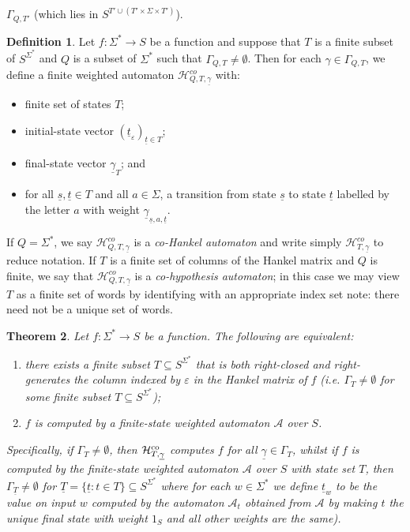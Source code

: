 \documentclass[10pt,a4paper]{amsart}
\newtheorem{thm}{Theorem}[section]
\theoremstyle{definition}
\newtheorem{defi}[thm]{Definition}
\numberwithin{equation}{section}
\numberwithin{theorem}{section}
\begin{document}
$\Gamma_{Q, T'}$ (which lies in $S^{T' \cup (T'\times \Sigma \times T')}$).
\begin{defi}
\label{definition:cohankel}
Let $f: \Sigma^* \rightarrow S$ be a function and suppose that $T$ is a finite subset of $S^{\Sigma^*}$ and $Q$ is a subset of $\Sigma^*$ such that $\Gamma_{Q, T} \neq \emptyset$. Then for each $\gamma \in \Gamma_{Q, T}$, we define a finite weighted automaton $\mathcal{H}^{co}_{Q, T, \underline{\gamma}}$ with:
\begin{itemize}
\item finite set of states $T$;
\item initial-state vector $(\underline{t}_\varepsilon)_{\underline{t} \in T}$;
\item final-state vector $\underline{\gamma}_{T}$; and
\item for all $\underline{s}, \underline{t} \in T$ and all $a \in \Sigma$, a transition from state $\underline{s}$ to state $\underline{t}$ labelled by the letter $a$ with weight $\underline{\gamma}_{\underline{s},a,\underline{t}}$.
\end{itemize}\noindent %
If $Q = \Sigma^*$,  we say $\mathcal{H}^{co}_{Q, T, \underline{\gamma}}$ is a \emph{co-Hankel automaton} and write simply $\mathcal{H}^{co}_{T, \underline{\gamma}}$ to reduce notation. If $T$ is a finite set of columns of the Hankel matrix and $Q$ is finite, we say that $\mathcal{H}^{co}_{Q, T, \underline{\gamma}}$ is a \emph{co-hypothesis automaton}; in this case we may view $T$ as a finite set of words by identifying with an appropriate index set note: there need not be a unique set of words.\end{defi} 

\begin{thm} 
\label{theorem:comain}
Let $f: \Sigma^* \rightarrow S$ be a function. The following are equivalent:
\begin{enumerate}
\item there exists a finite subset $T \subseteq S^{\Sigma^*}$ that is both right-closed and right-generates the column indexed by $\varepsilon$ in the Hankel matrix of $f$ (i.e. $\Gamma_T \neq \emptyset$ for some finite subset $T\subseteq S^{\Sigma^*}$);
\item $f$ is computed by a finite-state weighted automaton $\mathcal{A}$ over $S$.   
\end{enumerate}
Specifically, if $\Gamma_T \neq \emptyset$, then $\mathcal{H}^{\rm co}_{T, \underline{\gamma}}$ computes $f$ for all $\underline{\gamma}\in \Gamma_T$, whilst if $f$ is computed by the finite-state weighted automaton $\mathcal{A}$ over $S$ with state set $T$, then $\Gamma_{\underline{T}} \neq \emptyset$ for $\underline{T} = \{\underline{t}: t \in T\} \subseteq S^{\Sigma^*}$ where for each $w \in \Sigma^*$ we define  $\underline{t}_w$ to be the value on input $w$ computed by the automaton $\mathcal{A}_t$ obtained from $\mathcal{A}$ by making $t$ the unique final state with weight $1_S$ and all other weights are the same).
\end{thm}
\end{document}
